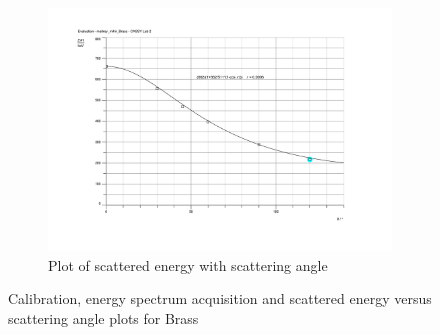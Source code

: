 \documentclass[%
 reprint,
nofootinbib,
 amsmath,amssymb,
 aps,
floatfix,
]{revtex4-2}
\begin{document}
\begin{figure}
\begin{subfigure}[b]{0.48\textwidth}
            \centering
            \includegraphics[scale = 0.069]{Figures/eval_brass_diagram.png}
            \caption{Plot of scattered energy with scattering angle}
            \label{fig:br-3}
        \end{subfigure}
            \caption{Calibration, energy spectrum acquisition and scattered energy versus scattering angle plots for Brass}
            \label{fig:br}
    \end{figure}
    
\end{document}
